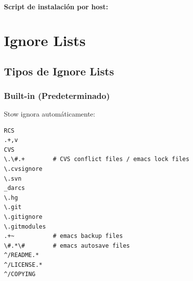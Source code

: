 \documentclass[
  doc,
  floatsintext,
  longtable,
  a4paper,
  nolmodern,
  notxfonts,
  notimes,
  12pt,
  colorlinks=true,linkcolor=blue,citecolor=blue,urlcolor=blue]{apa7}
\newenvironment{Shaded}{\begin{snugshade}}{\end{snugshade}}
\newcommand{\BuiltInTok}[1]{\textcolor[rgb]{0.00,0.23,0.31}{#1}}
\newcommand{\CommentTok}[1]{\textcolor[rgb]{0.37,0.37,0.37}{#1}}
\newcommand{\ControlFlowTok}[1]{\textcolor[rgb]{0.00,0.23,0.31}{\textbf{#1}}}
\newcommand{\ExtensionTok}[1]{\textcolor[rgb]{0.00,0.23,0.31}{#1}}
\newcommand{\FunctionTok}[1]{\textcolor[rgb]{0.28,0.35,0.67}{#1}}
\newcommand{\KeywordTok}[1]{\textcolor[rgb]{0.00,0.23,0.31}{\textbf{#1}}}
\newcommand{\NormalTok}[1]{\textcolor[rgb]{0.00,0.23,0.31}{#1}}
\newcommand{\OperatorTok}[1]{\textcolor[rgb]{0.37,0.37,0.37}{#1}}
\newcommand{\PreprocessorTok}[1]{\textcolor[rgb]{0.68,0.00,0.00}{#1}}
\newcommand{\SpecialStringTok}[1]{\textcolor[rgb]{0.13,0.47,0.30}{#1}}
\newcommand{\StringTok}[1]{\textcolor[rgb]{0.13,0.47,0.30}{#1}}
\newcommand{\VariableTok}[1]{\textcolor[rgb]{0.07,0.07,0.07}{#1}}
\begin{document}
\textbf{Script de instalación por host:}

\begin{Shaded}
\end{Shaded}

\section{Ignore Lists}\label{ignore-lists}

\subsection{Tipos de Ignore Lists}\label{tipos-de-ignore-lists}

\subsubsection{Built-in (Predeterminado)}\label{built-in-predeterminado}

Stow ignora automáticamente:

\begin{verbatim}
RCS
.+,v
CVS
\.\#.+        # CVS conflict files / emacs lock files
\.cvsignore
\.svn
_darcs
\.hg
\.git
\.gitignore
\.gitmodules
.+~           # emacs backup files
\#.*\#        # emacs autosave files
^/README.*
^/LICENSE.*
^/COPYING
\end{verbatim}
\end{document}
